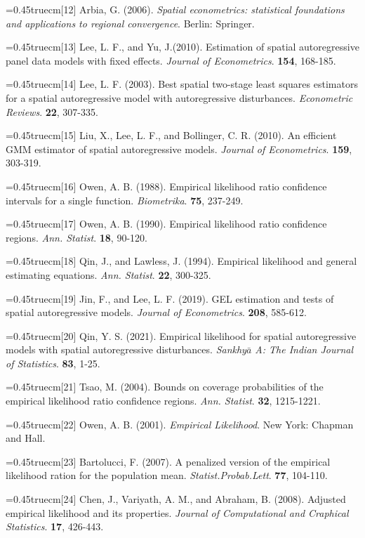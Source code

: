 \documentclass[onecolumn]{ctexart}	%
\def\nh{\noindent\hangindent=0.45truecm\hangafter=1}
\begin{document}
\nh [12] Arbia, G. (2006). \textit{Spatial econometrics: statistical foundations and applications to regional convergence}. Berlin: Springer. 

\nh [13] Lee, L. F., and Yu,  J.(2010). Estimation of spatial autoregressive panel data models with fixed effects. \textit{Journal of Econometrics}. \textbf{154},  168-185. 

\nh [14] Lee, L. F. (2003). Best spatial two-stage least squares estimators for a spatial autoregressive model with autoregressive disturbances. \textit{Econometric Reviews}. \textbf{22},  307-335. 

\nh [15] Liu, X., Lee, L. F., and Bollinger, C. R.  (2010). An efficient GMM estimator of spatial autoregressive models. \textit{Journal of Econometrics}. \textbf{159},  303-319.

\nh [16] Owen, A. B. (1988). Empirical likelihood ratio confidence intervals for a single function. \textit{Biometrika}. \textbf{75},   237-249.

\nh [17] Owen, A. B. (1990). Empirical likelihood ratio confidence regions. \textit{Ann. Statist}. \textbf{18},   90-120.

\nh [18] Qin, J., and Lawless, J. (1994). Empirical likelihood and general estimating equations. \textit{Ann. Statist}. \textbf{22},  300-325.

\nh [19] Jin, F., and Lee, L. F. (2019). GEL estimation and tests of spatial autoregressive models. \textit{Journal of Econometrics}. \textbf{208},  585-612.

\nh [20] Qin, Y. S. (2021). Empirical likelihood for spatial autoregressive models with spatial autoregressive disturbances. \textit{Sankhy$\bar{a}$ A: The Indian Journal of Statistics}. \textbf{83},  1-25.

\nh [21] Tsao, M. (2004). Bounds on coverage probabilities of the empirical likelihood ratio confidence regions. \textit{Ann. Statist}. \textbf{32},  1215-1221.

\nh [22] Owen, A. B. (2001). \textit{Empirical Likelihood}.  New York: Chapman and Hall.  

\nh [23] Bartolucci, F. (2007). A penalized version of the empirical likelihood ration for the population mean. \textit{Statist.Probab.Lett}. \textbf{77}, 104-110.

\nh [24] Chen, J., Variyath, A. M., and Abraham, B. (2008). Adjusted empirical likelihood and its properties. \textit{Journal of Computational and Craphical Statistics}. \textbf{17},  426-443.
\end{document}
